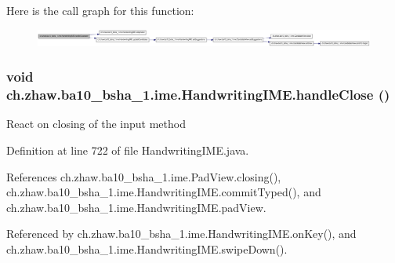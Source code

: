 Here is the call graph for this function:\nopagebreak
\begin{figure}[H]
\begin{center}
\leavevmode
\includegraphics[width=420pt]{classch_1_1zhaw_1_1ba10__bsha__1_1_1ime_1_1HandwritingIME_a5b7f7f06b8e6f5eb9797725b5d814f5c_cgraph}
\end{center}
\end{figure}
\hypertarget{classch_1_1zhaw_1_1ba10__bsha__1_1_1ime_1_1HandwritingIME_a4287014b4f552f286e8b51ef841573b1}{
\subsubsection[{handleClose}]{\setlength{\rightskip}{0pt plus 5cm}void ch.zhaw.ba10\_\-bsha\_\-1.ime.HandwritingIME.handleClose ()}}
\label{classch_1_1zhaw_1_1ba10__bsha__1_1_1ime_1_1HandwritingIME_a4287014b4f552f286e8b51ef841573b1}
React on closing of the input method 

Definition at line 722 of file HandwritingIME.java.

References ch.zhaw.ba10\_\-bsha\_\-1.ime.PadView.closing(), ch.zhaw.ba10\_\-bsha\_\-1.ime.HandwritingIME.commitTyped(), and ch.zhaw.ba10\_\-bsha\_\-1.ime.HandwritingIME.padView.

Referenced by ch.zhaw.ba10\_\-bsha\_\-1.ime.HandwritingIME.onKey(), and ch.zhaw.ba10\_\-bsha\_\-1.ime.HandwritingIME.swipeDown().

